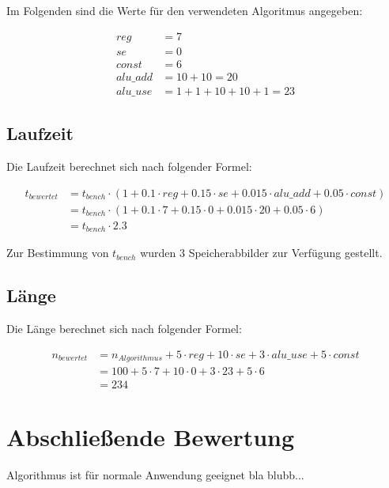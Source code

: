 
Im Folgenden sind die Werte für den verwendeten Algoritmus angegeben:

\begin{align*}
    reg      &= 7 \\
    se       &= 0 \\
    const    &= 6 \\
    alu\_add &= 10 + 10 = 20 \\
    alu\_use &= 1 + 1 + 10 + 10 + 1 = 23
\end{align*}

\subsection{Laufzeit}
\label{subsection:Dokumentation-BenchmarkBewertung-Berechnung-Laufzeit}

Die Laufzeit berechnet sich nach folgender Formel:

\begin{align*}
    t_{bewertet} &= t_{bench} \cdot (1 + 0.1 \cdot reg + 0.15 \cdot se + 0.015 \cdot alu\_add + 0.05 \cdot const) \\
                 &= t_{bench} \cdot (1 + 0.1 \cdot 7 + 0.15 \cdot 0 + 0.015 \cdot 20 + 0.05 \cdot 6) \\
                 &= t_{bench} \cdot 2.3
\end{align*}

Zur Bestimmung von $t_{bench}$ wurden 3 Speicherabbilder zur Verfügung gestellt. 

\subsection{Länge}
\label{subsection:Dokumentation-BenchmarkBewertung-Berechnung-Laenge}

Die Länge berechnet sich nach folgender Formel:

\begin{align*}
    n_{bewertet} &= n_{Algorithmus} + 5 \cdot reg + 10 \cdot se + 3 \cdot alu\_use + 5 \cdot const \\
                 &= 100 + 5 \cdot 7 + 10 \cdot 0 + 3 \cdot 23 + 5 \cdot 6 \\
                 &= 234
\end{align*}

\section{Abschließende Bewertung}
\label{section:Dokumentation-BenchmarkBewertung-Bewertung}

Algorithmus ist für normale Anwendung geeignet bla blubb... 
